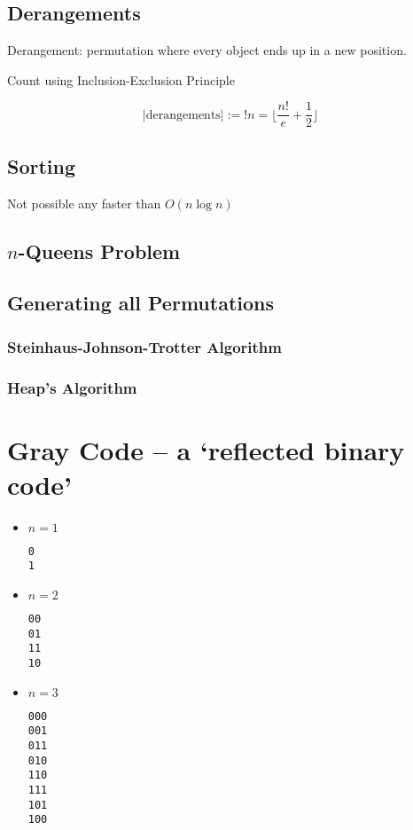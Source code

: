 \documentclass[11pt]{article}
\begin{document}
\subsection{Derangements}

Derangement: permutation where every object ends up in a new position. \newline

Count using Inclusion-Exclusion Principle

\[ |\text{derangements} | := !n = \lfloor \frac{n!}{e} + \frac{1}{2} \rfloor \]

\subsection{Sorting}

Not possible any faster than $ O(n \log n) $

\subsection{$ n $-Queens Problem}



\subsection{Generating all Permutations}


\subsubsection{Steinhaus-Johnson-Trotter Algorithm}

\subsubsection{Heap's Algorithm}

\section{Gray Code – a `reflected binary code'}

\begin{itemize}

\item $ n = 1 $
	\begin{lstlisting}
0
1
	\end{lstlisting}

\item $ n = 2 $
	\begin{lstlisting}
00
01
11
10
	\end{lstlisting}

\item $ n = 3 $
	\begin{lstlisting}
000
001
011
010
110
111
101
100
	\end{lstlisting}

\end{itemize}
\end{document}

